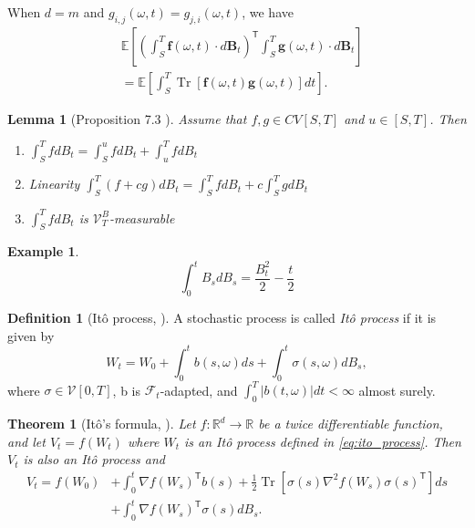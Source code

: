 \documentclass[12pt]{article}
\newtheorem{theorem}{Theorem}[section]
\newtheorem{lemma}[lemma]{Lemma}
\theoremstyle{definition}
\newtheorem{example}[example]{Example}
\newtheorem{definition}[definition]{Definition}
\numberwithin{equation}{section}
\newcommand{\R}{\mathbb{R}}
\newcommand{\CF}{\mathcal{F}}
\newcommand{\CV}{\mathcal{V}}
\newcommand{\T}{\mathsf{T}}
\newcommand{\ev}[1]{\mathbb{E}\left[{#1}\right]}
\DeclareMathOperator{\Tr}{Tr}
\begin{document}
When $d = m$ and $g_{i,j}(\omega,t) = g_{j,i}(\omega,t)$, we have
\begin{equation}
  \label{eq:multivariate_ito_isometry}
  \begin{split}
    &\ev{\left(\int_S^T \pmb{f}(\omega, t)\cdot d\pmb{B}_t\right)^\mathsf{T}\int_S^T \pmb{g}(\omega, t)\cdot d\pmb{B}_t}\\
    &= \ev{\int_S^T \Tr\left[\pmb{f}(\omega, t)\pmb{g}(\omega, t)\right]dt}.
  \end{split}
\end{equation}
\begin{lemma}[Proposition 7.3 ]
  Assume that $f,g \in CV[S,T]$ and $u \in [S,T]$. Then
  \begin{enumerate}[label=(\roman*)]
    \item $\displaystyle\int_S^TfdB_t = \int_S^ufdB_t + \int_u^TfdB_t$
    \item Linearity $\displaystyle\int_S^T(f+cg)dB_t =  \int_S^TfdB_t + c \int_S^TgdB_t$
    \item $\displaystyle\int_S^TfdB_t$ is $\CV_T^B$-measurable
  \end{enumerate}
\end{lemma}
\begin{example}
  \begin{equation}
    \int_0^t B_s dB_s = \frac{B_t^2}{2} - \frac{t}{2}
  \end{equation}
\end{example}
\begin{definition}[Itô process, \cite{eAppliedStochasticAnalysis2021}]
  A stochastic process is called \emph{Itô process} if it is given by
  \begin{equation}
    \label{eq:ito_process}
    W_t = W_0 + \int_0^tb(s, \omega)ds + \int_0^t \sigma(s, \omega)dB_s,
  \end{equation}
  where $\sigma \in \CV[0,T]$, b is $\CF_t$-adapted, and $\int_0^T |b(t, \omega)|dt < \infty$ almost surely.
\end{definition}
\begin{theorem}[Itô's formula, ]
  \label{thm:ito_formula}
  Let $f : \R^d \rightarrow \R$ be a twice differentiable function, and let $V_t = f(W_t)$ where $W_t$ is an Itô process defined in \eqref{eq:ito_process}. Then $V_t$ is also an Itô process and
  \begin{equation}
    \begin{split}
    V_t = f(W_0) &+ \int_0^t \nabla f(W_s)^\T b(s)+ \frac{1}{2}\Tr\left[\sigma(s) \nabla^2 f(W_s) \sigma(s)^\T\right]ds \\
    &+ \int_0^t \nabla f(W_s)^\T \sigma(s) dB_s.
    \end{split}
  \end{equation}
\end{theorem}
\end{document}
